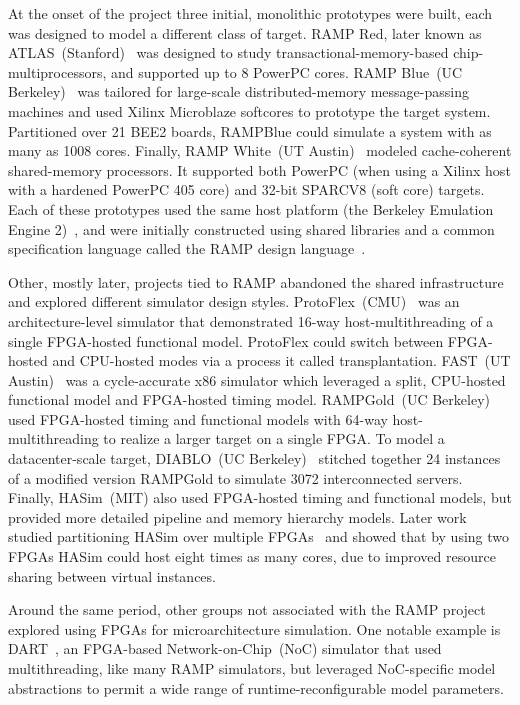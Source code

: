 At the onset of the project three initial, monolithic prototypes were built,
each was designed to model a different class of target.
RAMP Red, later known as ATLAS~(Stanford)~\cite{ATLAS} was designed to study transactional-memory-based chip-multiprocessors, and supported up to 8 PowerPC cores.
RAMP Blue~(UC Berkeley)~\cite{RAMPBlue} was tailored for large-scale distributed-memory message-passing machines and used Xilinx
Microblaze softcores to prototype the target system. Partitioned over 21
BEE2 boards, RAMPBlue could simulate a system with as many as 1008 cores.
Finally, RAMP White~(UT Austin)~\cite{RAMPWhite} modeled cache-coherent
shared-memory processors. It supported both PowerPC (when using a Xilinx
host with a hardened PowerPC 405 core) and 32-bit SPARCV8 (soft core) targets.
Each of these prototypes used the same host platform (the Berkeley Emulation
Engine 2)~\cite{BEE2}, and were initially constructed using shared libraries and a common
specification language called the RAMP design language~\cite{RDL}.

Other, mostly later, projects tied to RAMP abandoned the shared infrastructure
and explored different simulator design styles.
ProtoFlex~(CMU)~\cite{ProtoFlex} was an architecture-level simulator that
demonstrated 16-way host-multithreading of a single FPGA-hosted functional
model.  ProtoFlex could switch between FPGA-hosted and CPU-hosted modes via
a process it called transplantation. FAST~(UT Austin)~\cite{FAST} was a cycle-accurate
x86 simulator which leveraged a split, CPU-hosted functional model and FPGA-hosted
timing model. RAMPGold~(UC Berkeley)~\cite{RAMPGold} used FPGA-hosted timing
and functional models with 64-way host-multithreading to realize a larger
target on a single FPGA.  To model a datacenter-scale target,
DIABLO~(UC Berkeley)~\cite{Diablo} stitched together 24 instances of a modified version RAMPGold to simulate 3072 interconnected
servers.  Finally, HASim~\cite{HASim}(MIT) also used FPGA-hosted timing and
functional models, but provided more detailed pipeline and memory hierarchy
models. Later work studied partitioning HASim over multiple FPGAs~\cite{LIFPGADesign} and showed that by using two FPGAs HASim could host eight
times as many cores, due to improved resource sharing between virtual
instances.

Around the same period, other groups not associated with the RAMP project explored
using FPGAs for microarchitecture simulation.  One notable example is
DART~\cite{DART}, an FPGA-based Network-on-Chip~(NoC) simulator that used
multithreading, like many RAMP simulators, but leveraged NoC-specific model abstractions
to permit a wide range of runtime-reconfigurable model parameters.

